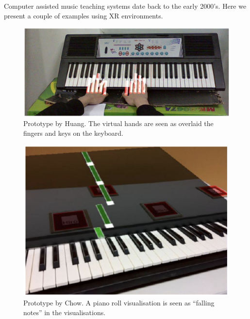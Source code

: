 \documentclass[manuscript,screen]{acmart}
\begin{document}
Computer assisted music teaching systems date back to the early 2000’s. Here we present a couple of examples using XR environments. 

\begin{figure}[h]
\centering
 \includegraphics[width=12cm]{figures/huang.png}
    \caption{Prototype by Huang. The virtual hands are seen as overlaid the fingers and keys on the keyboard.
    }\label{fig:huang}
\end{figure}
\begin{figure}[h]
\centering
 \includegraphics[width=12cm]{figures/chow.png}
    \caption{Prototype by Chow. A piano roll visualisation is seen as “falling notes” in the visualisations.
    }\label{fig:chow}
\end{figure}
\end{document}
